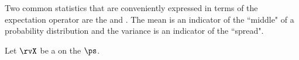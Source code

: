 Two common statistics that are conveniently expressed in terms of the
expectation operator are the  and .
The mean is an indicator of the ``middle" of a probability distribution and the
variance is an indicator of the ``spread".
\begin{definition}
\label{def:Mx}
\label{def:pvar}
\label{def:pVar}
Let $\rvX$ be a  on the  $\ps$.
\end{definition}

